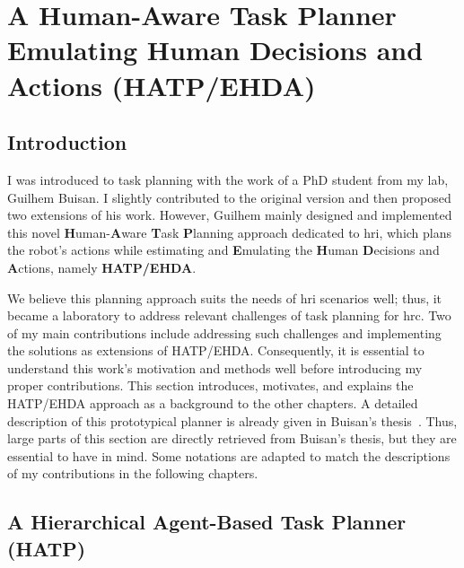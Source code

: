 \cleardoublepage

\ifdefined{}
\else
\setcounter{chapter}{1} %
\dominitoc
\faketableofcontents
\fi

\chapter{A Human-Aware Task Planner Emulating Human Decisions and Actions (HATP/EHDA)}
\label{chap:2}
\minitoc


\section{Introduction}

I was introduced to task planning with the work of a PhD student from my lab, Guilhem Buisan. I slightly contributed to the original version and then proposed two extensions of his work. However, Guilhem mainly designed and implemented this novel \textbf{H}uman-\textbf{A}ware \textbf{T}ask \textbf{P}lanning approach dedicated to \acrfull{hri}, which plans the robot's actions while estimating and \textbf{E}mulating the \textbf{H}uman \textbf{D}ecisions and \textbf{A}ctions, namely \textbf{HATP/EHDA}. 

We believe this planning approach suits the needs of \acrshort{hri} scenarios well; thus, it became a laboratory to address relevant challenges of task planning for \acrshort{hrc}. 
Two of my main contributions include addressing such challenges and implementing the solutions as extensions of HATP/EHDA.   
Consequently, it is essential to understand this work's motivation and methods well before introducing my proper contributions. This section introduces, motivates, and explains the HATP/EHDA approach as a background to the other chapters. 
A detailed description of this prototypical planner is already given in Buisan's thesis~\cite{thesisBuisan21}. Thus, large parts of this section are directly retrieved from Buisan's thesis, but they are essential to have in mind. Some notations are adapted to match the descriptions of my contributions in the following chapters. 

\section{A Hierarchical Agent-Based Task Planner (HATP)}

